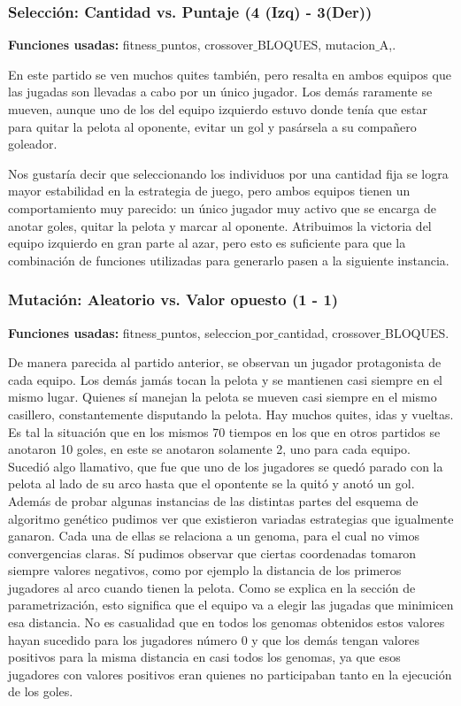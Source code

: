 \subsubsection*{Selección: Cantidad vs. Puntaje (4 (Izq) - 3(Der))}
\textbf{Funciones usadas: } fitness$\_$puntos, crossover$\_$BLOQUES, mutacion$\_$A,.

En este partido se ven muchos quites también, pero resalta en ambos equipos que las jugadas son llevadas a cabo por un único jugador.
Los demás raramente se mueven, aunque uno de los del equipo izquierdo estuvo donde tenía que estar para quitar la pelota al oponente, evitar un gol y pasársela a su compañero goleador.

Nos gustaría decir que seleccionando los individuos por una cantidad fija se logra mayor estabilidad en la estrategia de juego, pero ambos equipos tienen un comportamiento muy parecido: un único jugador muy activo que se encarga de anotar goles, quitar la pelota y marcar al oponente. Atribuimos la victoria del equipo izquierdo en gran parte al azar, pero esto es suficiente para que la combinación de funciones utilizadas para generarlo pasen a la siguiente instancia.

\subsubsection*{Mutación: Aleatorio vs. Valor opuesto (1 - 1)}
\textbf{Funciones usadas: } fitness$\_$puntos, seleccion$\_$por$\_$cantidad, crossover$\_$BLOQUES.

De manera parecida al partido anterior, se observan un jugador protagonista de cada equipo. Los demás jamás tocan la pelota y se mantienen casi siempre en el mismo lugar. Quienes sí manejan la pelota se mueven casi siempre en el mismo casillero, constantemente disputando la pelota. Hay muchos quites, idas y vueltas. Es tal la situación que en los mismos 70 tiempos en los que en otros partidos se anotaron 10 goles, en este se anotaron solamente 2, uno para cada equipo. Sucedió algo llamativo, que fue que uno de los jugadores se quedó parado con la pelota al lado de su arco hasta que el opontente se la quitó y anotó un gol.\\

Además de probar algunas instancias de las distintas partes del esquema de algoritmo genético pudimos ver que existieron variadas estrategias que igualmente ganaron. Cada una de ellas se relaciona a un genoma, para el cual no vimos convergencias claras. Sí pudimos observar que ciertas coordenadas tomaron siempre valores negativos, como por ejemplo la distancia de los primeros jugadores al arco cuando tienen la pelota. Como se explica en la sección de parametrización, esto significa que el equipo va a elegir las jugadas que minimicen esa distancia. No es casualidad que en todos los genomas obtenidos estos valores hayan sucedido para los jugadores número 0 y que los demás tengan valores positivos para la misma distancia en casi todos los genomas, ya que esos jugadores con valores positivos eran quienes no participaban tanto en la ejecución de los goles.

